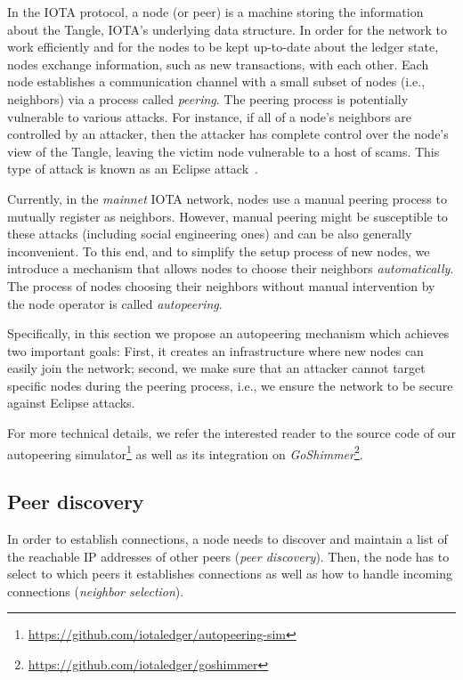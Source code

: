 \documentclass[../main.tex]{subfiles}
\begin{document}
In the IOTA protocol, a node (or peer) is a machine storing the information about the Tangle, IOTA’s underlying data structure.
%
In order for the network to work efficiently and for the nodes to be kept up-to-date about the ledger state, nodes exchange information, such as new transactions, with each other.
%
Each node establishes a communication channel with a small subset of nodes (i.e., neighbors) via a process called \emph{peering}.
%
The peering process is potentially vulnerable to various attacks.  
%
For instance, if all of a node's neighbors are controlled by an attacker, then the attacker has complete control over the node's view of the Tangle, leaving the victim node vulnerable to a host of scams.  
%
This type of attack is known as an Eclipse attack~\cite{germanus2014mitigating, eclipseOnBitcoin,  ismail2015detecting}. 
%

Currently, in the \emph{mainnet} IOTA network, nodes use a manual peering process to mutually register as neighbors. 
%
However, manual peering might be susceptible to these attacks
(including social engineering ones)
and can be also generally inconvenient. 
%
To this end, and to simplify the setup process of new nodes, we introduce a mechanism that allows nodes to choose their neighbors \textit{automatically}. 
%
The process of nodes choosing their neighbors without manual intervention by the node operator is called \emph{autopeering}.

Specifically, in this section we propose an autopeering mechanism which achieves two important goals: First, it creates an infrastructure where new nodes can easily join the network; second, we make sure that an attacker cannot target specific nodes during the peering process, i.e., we ensure the network to be secure against Eclipse attacks.

For more technical details, we refer the interested reader to the source code of our autopeering simulator\footnote{\url{https://github.com/iotaledger/autopeering-sim}} as well as its integration on \emph{GoShimmer}\footnote{\url{https://github.com/iotaledger/goshimmer}}.

\subsection{Peer discovery}

In order to establish connections, a node needs to discover and maintain a list of the reachable IP addresses of other peers (\emph{peer discovery}).
%
Then, the node has to select to which peers it establishes connections as well as how to handle incoming connections (\emph{neighbor selection}). 
%
\end{document}
